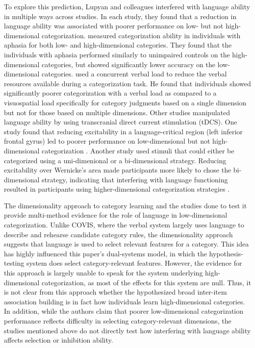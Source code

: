 \documentclass[../dissertation.tex]{subfiles}
\begin{document}
	To explore this prediction, Lupyan and colleagues interfered with language ability in multiple ways across studies. In each study, they found that a reduction in language ability was associated with poorer performance on low- but not high-dimensional categorization. \citet{Lupyan2013} measured categorization ability in individuals with aphasia for both low- and high-dimensional categories. They found that the individuals with aphasia performed similarly to unimpaired controls on the high-dimensional categories, but showed significantly lower accuracy on the low-dimensional categories. \citet{Lupyan2009} used a concurrent verbal load to reduce the verbal resources available during a categorization task. He found that individuals showed significantly poorer categorization with a verbal load as compared to a visuospatial load specifically for category judgments based on a single dimension but not for those based on multiple dimensions. Other studies manipulated language ability by using transcranial direct current stimulation (tDCS). One study found that reducing excitability in a language-critical region (left inferior frontal gyrus) led to poorer performance on low-dimensional but not high-dimensional categorization \citep{Lupyan2012b}. Another study used stimuli that could either be categorized using a uni-dimenional or a bi-dimensional strategy. Reducing excitability over Wernicke's area made participants more likely to chose the bi-dimensional strategy, indicating that interfering with language functioning resulted in participants using higher-dimensional categorization strategies \citep{Perry2014}. \par 
	The dimensionality approach to category learning and the studies done to test it provide multi-method evidence for the role of language in low-dimensional categorization. Unlike COVIS, where the verbal system largely uses language to describe and rehearse candidate category rules, the dimensionality approach suggests that language is used to select relevant features for a category. This idea has highly influenced this paper's dual-systems model, in which the hypothesis-testing system does select category-relevant features. However, the evidence for this approach is largely unable to speak for the system underlying high-dimensional categorization, as most of the effects for this system are null. Thus, it is not clear from this approach whether the hypothesized broad inter-item association building is in fact how individuals learn high-dimensional categories. In addition, while the authors claim that poorer low-dimensional categorization performance reflects difficulty in selecting category-relevant dimensions, the studies mentioned above do not directly test how interfering with language ability affects selection or inhibition ability.
	
\end{document}
